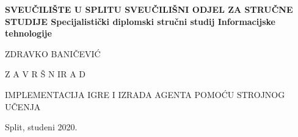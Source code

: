%
%
\begin{titlepage}
	\bfseries
	\headerdata
	{SVEUČILIŠTE U SPLITU}
	{SVEUČILIŠNI ODJEL ZA STRUČNE STUDIJE}
	{Specijalistički diplomski stručni studij Informacijske tehnologije}
	
	\vspace*{6cm}
	\begin{center}
		{\Large ZDRAVKO BANIČEVIĆ}
		
		\vspace*{1cm}
		
		{\LARGE {Z A V R Š N I\space\space\space R A D}}
		
		\vspace*{1cm}
		\Large IMPLEMENTACIJA IGRE I IZRADA AGENTA POMOĆU STROJNOG UČENJA\\[1cm]
	
	\end{center}
	\begin{center}
		\vfill
		{\large\normalfont Split, studeni 2020.}
	\end{center}
\end{titlepage}
%
%